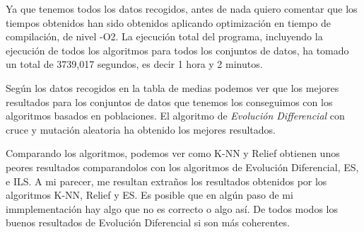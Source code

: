\documentclass[14pt]{article}
\begin{document}
Ya que tenemos todos los datos recogidos, antes de nada quiero comentar que los tiempos obtenidos han sido obtenidos aplicando optimización en tiempo de compilación, de nivel -O2. La ejecución total del programa, incluyendo la ejecución de todos los algoritmos para todos los conjuntos de datos, ha tomado un total de 3739,017 segundos, es decir 1 hora y 2 minutos.

Según los datos recogidos en la tabla de medias podemos ver que los mejores resultados para los conjuntos de datos que tenemos los conseguimos con los algoritmos basados en poblaciones. El algoritmo de \textit{Evolución Differencial} con cruce y mutación aleatoria ha obtenido los mejores resultados.

Comparando los algoritmos, podemos ver como K-NN y Relief obtienen unos peores resultados comparandolos con los algoritmos de Evolución Diferencial, ES, e ILS. A mi parecer, me resultan extraños los resultados obtenidos por los algoritmos K-NN, Relief y ES. Es posible que en algún paso de mi immplementación hay algo que no es correcto o algo así. De todos modos los buenos resultados de Evolución Diferencial si son más coherentes.
\end{document}
